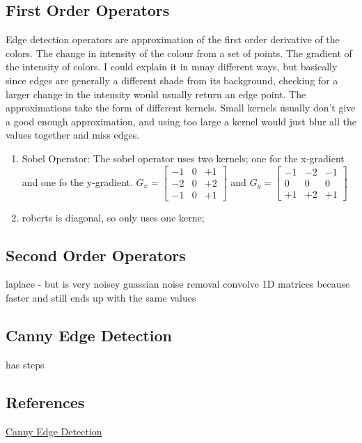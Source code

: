 \subsection{First Order Operators}
Edge detection operators are approximation of the first order derivative of the colors. The change in intensity of the colour from a set of points. The gradient of the intensity of colors. I could explain it in mnay different ways, but basically since edges are generally a different shade from its background, checking for a larger change in the intensity would usually return an edge point.
\newline
The approximations take the form of different kernels. Small kernels usually don't give a good enough approximation, and using too large a kernel would just blur all the values together and miss edges.
\begin{enumerate}
	\item Sobel Operator: The sobel operator uses two kernels; one for the x-gradient and one fo the y-gradient. $G_x =
	\begin{bmatrix}
		-1 & 0 & +1 \\
		-2 & 0 & +2 \\
		-1 & 0 & +1
	\end{bmatrix}$ and $G_y = 
		\begin{bmatrix}
	-1 & -2 & -1 \\
	0 & 0 & 0 \\
	+1 & +2 & +1
	\end{bmatrix}$
	\item roberts is diagonal, so only uses one kerne;
\end{enumerate}

\subsection{Second Order Operators}
laplace - but is very noisey
guassian noise removal
convolve 1D matrices because faster and still ends up with the same values

\subsection{Canny Edge Detection}
has steps

\subsection{References}
\href{http://fourier.eng.hmc.edu/e161/lectures/canny/node1.html}{Canny Edge Detection}